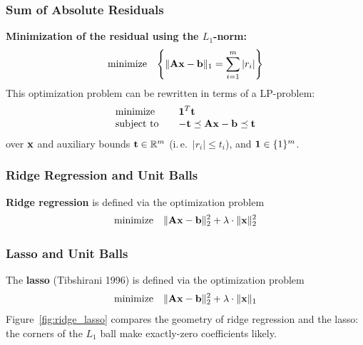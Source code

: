   
\subsubsection{Sum of Absolute Residuals}
\textbf{Minimization of the residual using the $L_1$-norm:}
  \begin{displaymath}
    \mbox{minimize}\quad \Bigg\{ \| \mathbf{A} \bm{\mathrm{x}} -\bm{\mathrm{b}}\|_1 = \sum_{i=1}^m  |r_i| \Bigg\}
  \end{displaymath}
  This optimization problem can be rewritten in terms of a LP-problem:
  \begin{eqnarray*}
    \begin{array}{lcl}
      \mbox{minimize}   & & \bm{\mathrm{1}}^T \bm{\mathrm{t}} \\
      \mbox{subject to} & & - \bm{\mathrm{t}} \preceq  \mathbf{A} \bm{\mathrm{x}} -\bm{\mathrm{b}}\preceq \bm{\mathrm{t}}
    \end{array}
  \end{eqnarray*}
  over $\bm{\mathrm{x}}$ and auxiliary bounds $\bm{\mathrm{t}}\in \mathbb{R}^m$ (i.\,e.\ $|r_i|\le t_i$), and $\bm{\mathrm{1}} \in \{1\}^m$.
 
\subsubsection{Ridge Regression and Unit Balls}
\textbf{Ridge regression} is defined via the optimization problem
  \begin{displaymath}
    \mbox{minimize} \quad \|\mathbf{A}\bm{\mathrm{x}} -\bm{\mathrm{b}}\|_2^2+\lambda \cdot\|\bm{\mathrm{x}}\|_2^2
  \end{displaymath}
 
\subsubsection{Lasso and Unit Balls}
  The \textbf{lasso} (Tibshirani 1996) is defined via the optimization problem
  \begin{displaymath}
    \mbox{minimize} \quad \|\mathbf{A}\bm{\mathrm{x}} -\bm{\mathrm{b}}\|_2^2+\lambda \cdot\|\bm{\mathrm{x}}\|_1
  \end{displaymath}
  Figure~\ref{fig:ridge_lasso} compares the geometry of ridge regression and the lasso: the corners of the $L_1$ ball make exactly-zero coefficients likely.

